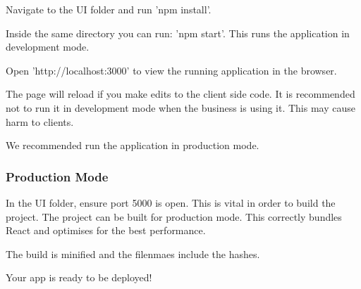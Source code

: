 Navigate to the UI folder and run 'npm install'.

Inside the same directory you can run:
'npm start'. This runs the application in development mode.

Open 'http://localhost:3000' to view the running application in the browser.

The page will reload if you make edits to the client side code. It is recommended not to
run it in development mode when the business is using it. This may cause harm to clients.

We recommended run the application in production mode.

\subsubsection*{Production Mode}

In the UI folder, ensure port 5000 is open. This is vital in order to build the project.
The project can be built for production mode. This correctly bundles React and optimises for
the best performance.

The build is minified and the filenmaes include the hashes.

Your app is ready to be deployed!